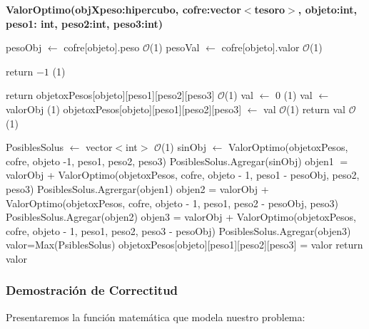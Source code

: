\documentclass[spanish,12pt]{article}
\begin{document}

\begin{algorithm}[H]{\textbf{ValorOptimo(objXpeso:hipercubo, cofre:vector$<$tesoro$>$, objeto:int, peso1: int, peso2:int, peso3:int)}}
	\begin{algorithmic}[1]
		\State  pesoObj $\gets$ cofre[objeto].peso \Comment $\mathcal{O}$(1)
		\State  pesoVal $\gets$ cofre[objeto].valor \Comment $\mathcal{O}$(1)

			\State return $-1$ \Comment {}(1)

		\EndIf

			\State return objetoxPesos[objeto][peso1][peso2][peso3] \Comment $\mathcal{O}$(1)
		\EndIf
			\State val $\gets$ 0 \Comment {}(1)
				\State val $\gets$ valorObj \Comment {}(1)
				\State objetoxPesos[objeto][peso1][peso2][peso3] $\gets$ val \Comment $\mathcal{O}$(1)
				\State return val \Comment $\mathcal{O}$(1)
			\EndIf

		\Else
			\State PosiblesSolus $\gets$ vector$<$int$>$ \Comment $\mathcal{O}$(1)
			\State sinObj $\gets$ ValorOptimo(objetoxPesos, cofre, objeto -1, peso1, peso2, peso3)
			\State PosiblesSolus.Agregar(sinObj)
				\State objen1 $=$ valorObj + ValorOptimo(objetoxPesos, cofre, objeto - 1, peso1 - pesoObj, peso2, peso3)
				\State PosiblesSolus.Agrergar(objen1)
			\EndIf
				\State objen2 = valorObj + ValorOptimo(objetoxPesos, cofre, objeto - 1, peso1, peso2  - pesoObj, peso3)
				\State PosiblesSolus.Agregar(objen2)
			\EndIf
				\State objen3 = valorObj + ValorOptimo(objetoxPesos, cofre, objeto - 1, peso1, peso2, peso3  - pesoObj)
				\State PosiblesSolus.Agregar(objen3)
			\EndIf
			\State valor=Max(PsiblesSolus)
			\State objetoxPesos[objeto][peso1][peso2][peso3] = valor
			\State return valor
		\EndIf


	\end{algorithmic}
\end{algorithm}

\newpage

\subsubsection{Demostración de Correctitud}
Presentaremos la función matemática que modela nuestro problema:\\
\end{document}
